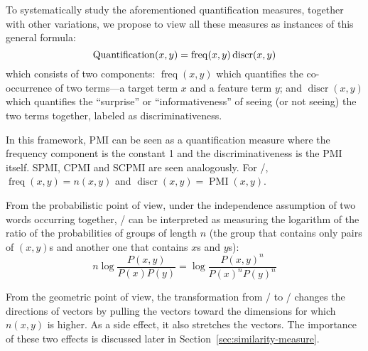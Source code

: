 To systematically study the aforementioned quantification measures, together with other variations, we propose to view all these measures as instances of this general formula:
%
\begin{equation}
  \small
  \label{eq:association}
  \operatorname{Quantification}(x,y) = \operatorname{freq}(x, y)
                                       \operatorname{discr}(x, y)
\end{equation}
%
which consists of two components: $\operatorname{freq}(x, y)$ which quantifies the co-occurrence of two terms---a target term $x$ and a feature term $y$; and $\operatorname{discr}(x, y)$ which quantifies the ``surprise'' or ``informativeness'' of seeing (or not seeing) the two terms together, labeled as discriminativeness.

In this framework, PMI can be seen as a quantification measure where the frequency component is the constant 1 and the discriminativeness is the PMI itself. SPMI, CPMI and SCPMI are seen analogously. For \NPMI/, $\operatorname{freq}(x, y) = n(x, y)$ and $\operatorname{discr}(x, y) = \operatorname{PMI}(x, y)$.

From the probabilistic point of view, under the independence assumption of two words occurring together, \NPMI/ can be interpreted as measuring the logarithm of the ratio of the probabilities of groups of length $n$ (the group that contains only pairs of $(x,y)$s and another one that contains $x$s and $y$s):
%
\begin{equation*}
  n\log\frac{P(x, y)}{P(x)P(y)} = \log\frac{P(x, y)^{n}}{P(x)^{n}P(y)^{n}}
\end{equation*}
%
%
%

From the geometric point of view, the transformation from \PMI/ to \NPMI/ changes the directions of vectors by pulling the vectors toward the dimensions for which $n(x, y)$ is higher. As a side effect, it also stretches the vectors. The importance of these two effects is discussed later in Section~\ref{sec:similarity-measure}.

